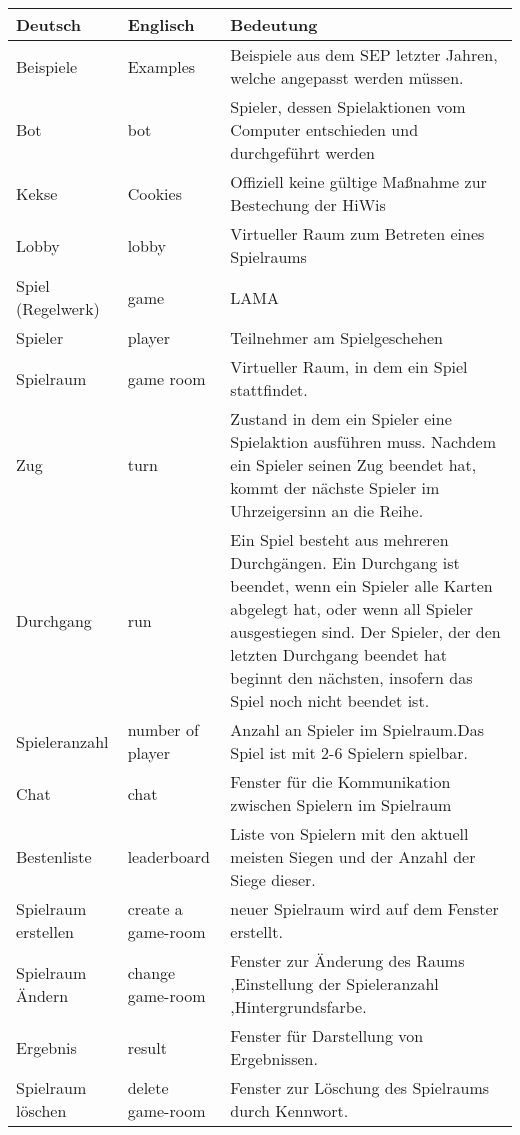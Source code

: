 \begin{center}
		\begin{longtable}{p{} p{} p{}}
			\textbf{Deutsch} & \textbf{Englisch} & \textbf{Bedeutung} \\
			\hline \hline \endhead
			Beispiele & Examples & Beispiele aus dem SEP letzter Jahren, welche angepasst werden müssen.\\                      
			Bot & bot & Spieler, dessen Spielaktionen vom Computer entschieden und durchgeführt werden\\
			Kekse & Cookies & Offiziell keine gültige Maßnahme zur Bestechung der HiWis\\          
 			Lobby & lobby & Virtueller Raum zum Betreten eines Spielraums\\	
			Spiel (Regelwerk) & game & LAMA \\
			Spieler & player & Teilnehmer am Spielgeschehen\\
			Spielraum & game room & Virtueller Raum, in dem ein Spiel stattfindet.\\
			Zug & turn & Zustand in dem ein Spieler eine Spielaktion ausführen muss. Nachdem ein Spieler seinen Zug beendet hat, kommt der nächste Spieler im Uhrzeigersinn an die Reihe.\\
			Durchgang & run & Ein Spiel besteht aus mehreren Durchgängen. Ein Durchgang ist beendet, wenn ein Spieler alle Karten abgelegt hat, oder wenn all Spieler ausgestiegen sind. Der Spieler, der den letzten Durchgang beendet hat beginnt den nächsten, insofern das Spiel noch nicht beendet ist.\\
			Spieleranzahl& number of player & Anzahl an Spieler im Spielraum.Das Spiel ist mit 2-6 Spielern spielbar.\\
			Chat & chat & Fenster für die Kommunikation zwischen Spielern im Spielraum\\
			Bestenliste & leaderboard & Liste von Spielern mit den aktuell meisten Siegen und der Anzahl der Siege dieser.\\
			Spielraum erstellen & create a game-room & neuer Spielraum wird auf dem Fenster erstellt.\\
			Spielraum Ändern & change game-room  & Fenster zur Änderung des Raums ,Einstellung der Spieleranzahl ,Hintergrundsfarbe.\\
			Ergebnis & result & Fenster für Darstellung von Ergebnissen.\\
			Spielraum löschen & delete game-room & Fenster zur Löschung des Spielraums durch Kennwort.\\

\end{longtable}
\end{center}

